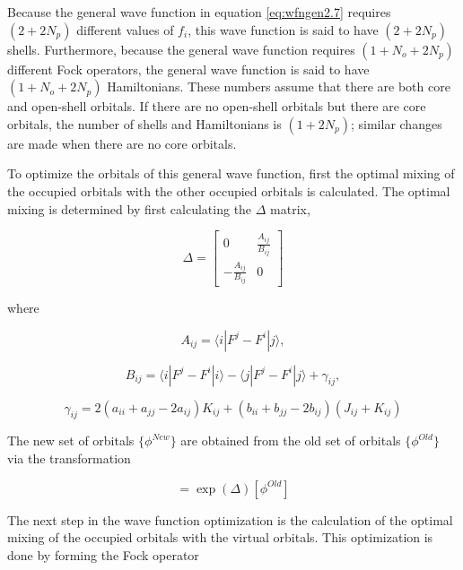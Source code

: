 Because the general wave function in equation \ref{eq:wfngen2.7}
requires $(2+2N_p)$ different values of $f_i$, this wave function is
said to have $(2+2N_p)$ shells. Furthermore, because the general wave
function requires $(1+N_o+2N_p)$ different Fock operators, the general
wave function is said to have $(1+N_o+2N_p)$ Hamiltonians. These
numbers assume that there are both core and open-shell orbitals. If
there are no open-shell orbitals but there are core orbitals, the
number of shells and Hamiltonians is $(1+2N_p)$; similar changes are
made when there are no core orbitals.

To optimize the orbitals of this general wave function, first the
optimal mixing of the occupied orbitals with the other
occupied orbitals is calculated. The optimal mixing is
determined by first calculating the $\Delta$ matrix,  

\begin{equation}
  \Delta = \left[\begin{array}{cc}
	0 & \frac{A_{ij}}{B_{ij}} \\
	-\frac{A_{ij}}{B_{ij}} & 0
	\end{array}\right]
\label{eq:del2.7}
\end{equation}

\noindent where

\begin{equation}
  A_{ij} = \langle i|F^j-F^i|j\rangle,
\end{equation}

\begin{equation}
  B_{ij} = \langle i|F^j-F^i|i \rangle 
	- \langle j|F^j-F^i|j \rangle + \gamma_{ij},
\end{equation}

\begin{equation}
  \gamma_{ij} = 2(a_{ii}+a_{jj}-2a_{ij})K_{ij}
		+ (b_{ii}+b_{jj}-2b_{ij})(J_{ij}+K_{ij})
\label{eq:gamma2.7}
\end{equation}

\noindent The new set of orbitals $\{\phi^{New}\}$ are obtained from
the old set of orbitals $\{\phi^{Old}\}$ via the transformation

\begin{equation}
  [\phi^{New}] = \exp(\Delta)[\phi^{Old}]
\end{equation}

The next step in the wave function optimization is the calculation of
the optimal mixing of the occupied orbitals with the virtual
orbitals. This optimization is done by forming the Fock
operator 

